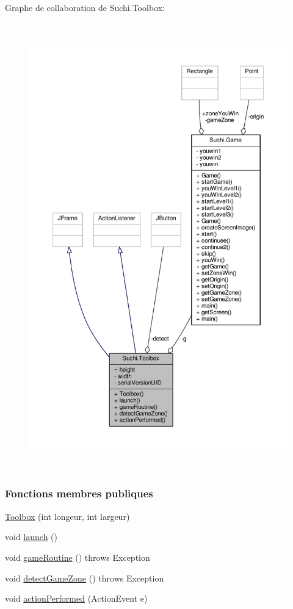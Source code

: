 Graphe de collaboration de Suchi.\+Toolbox\+:\nopagebreak
\begin{figure}[H]
\begin{center}
\leavevmode
\includegraphics[height=550pt]{classSuchi_1_1Toolbox__coll__graph}
\end{center}
\end{figure}
\subsubsection*{Fonctions membres publiques}
\begin{DoxyCompactItemize}
\item 
\hyperlink{classSuchi_1_1Toolbox_a126737219de21348250cf1d133c45482}{Toolbox} (int longeur, int largeur)
\item 
void \hyperlink{classSuchi_1_1Toolbox_a678c49ecdb4acae607cd30274314a1e0}{launch} ()
\item 
void \hyperlink{classSuchi_1_1Toolbox_ac29db51b30aba7068a420bdc88896d57}{game\+Routine} ()  throws Exception 
\item 
void \hyperlink{classSuchi_1_1Toolbox_ad1ff50c595b5afb7602b002a6470b102}{detect\+Game\+Zone} ()  throws Exception 
\item 
void \hyperlink{classSuchi_1_1Toolbox_afddd81f4c4c44aef35afab36b80fb2ae}{action\+Performed} (Action\+Event e)
\end{DoxyCompactItemize}
